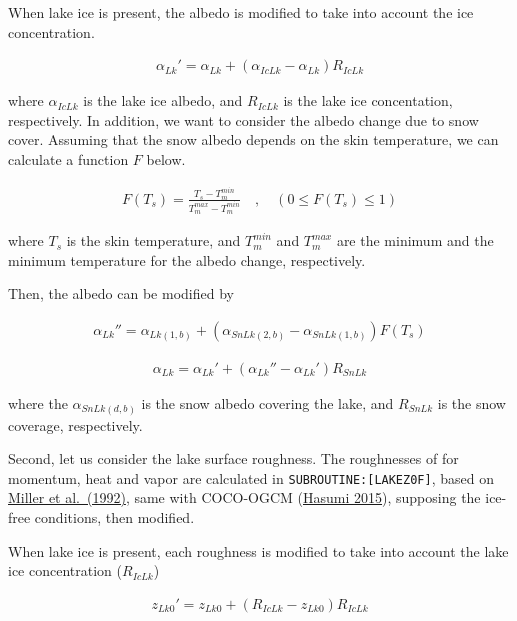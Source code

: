 When lake ice is present, the albedo is modified to take into account
the ice concentration.

\begin{eqnarray}
    {\alpha_{Lk}'} = \alpha_{Lk} + (\alpha_{IcLk}-\alpha_{Lk}) R_{IcLk}
\end{eqnarray}

where \(\alpha_{IcLk}\) is the lake ice albedo, and \(R_{IcLk}\) is the
lake ice concentation, respectively. In addition, we want to consider
the albedo change due to snow cover. Assuming that the snow albedo
depends on the skin temperature, we can calculate a function \(F\)
below.

\begin{eqnarray}
    F(T_s) = \frac{T_s-T_m^{min}}{T_m^{max}-T_m^{min}} \quad,\quad (0 \le F(T_s)\le 1)
\end{eqnarray}

where \(T_s\) is the skin temperature, and \(T_m^{min}\) and
\(T_m^{max}\) are the minimum and the minimum temperature for the albedo
change, respectively.

Then, the albedo can be modified by

\begin{eqnarray}
    {\alpha_{Lk}''} = \alpha_{Lk(1,b)} + (\alpha_{SnLk(2,b)}-\alpha_{SnLk(1,b)})F(T_s)
\end{eqnarray}

\begin{eqnarray}
    \alpha_{Lk} = {\alpha_{Lk}'} +(\alpha_{Lk}''-\alpha_{Lk}')R_{SnLk}
\end{eqnarray}

where the \(\alpha_{SnLk(d,b)}\) is the snow albedo covering the lake,
and \(R_{SnLk}\) is the snow coverage, respectively.

Second, let us consider the lake surface roughness. The roughnesses of
for momentum, heat and vapor are calculated in
\texttt{SUBROUTINE:{[}LAKEZ0F{]}}, based on
\href{https://www.sciencedirect.com/science/article/pii/S1359029497800489}{Miller
et al.~(1992)}, same with COCO-OGCM
(\href{https://ccsr.aori.u-tokyo.ac.jp/~hasumi/COCO/coco4.pdf}{Hasumi
2015}), supposing the ice-free conditions, then modified.

When lake ice is present, each roughness is modified to take into
account the lake ice concentration (\(R_{IcLk}\))

\begin{eqnarray}
    {z_{Lk0}'} = z_{Lk0} + (R_{IcLk} -z_{Lk0}) R_{IcLk}
\end{eqnarray}

